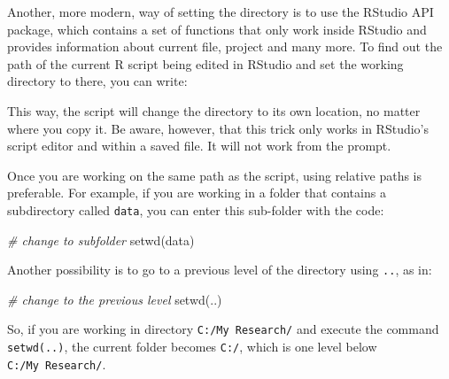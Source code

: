 \documentclass[
  12pt,
]{book}
\newenvironment{Shaded}{\begin{snugshade}}{\end{snugshade}}
\newcommand{\CommentTok}[1]{\textcolor[rgb]{0.37,0.37,0.37}{\textit{#1}}}
\newcommand{\FunctionTok}[1]{\textcolor[rgb]{0,0,0}{#1}}
\newcommand{\NormalTok}[1]{#1}
\newcommand{\OtherTok}[1]{\textcolor[rgb]{0.37,0.37,0.37}{#1}}
\newcommand{\SpecialCharTok}[1]{\textcolor[rgb]{0,0,0}{#1}}
\newcommand{\StringTok}[1]{\textcolor[rgb]{0.5,0.5,0.5}{#1}}
\begin{document}
Another, more modern, way of setting the directory is to use the RStudio API package, which contains a set of functions that only work inside RStudio and provides information about current file, project and many more. To find out the path of the current R script being edited in RStudio and set the working directory to there, you can write:

\begin{Shaded}
\end{Shaded}

This way, the script will change the directory to its own location, no matter where you copy it. Be aware, however, that this trick only works in RStudio's script editor and within a saved file. It will not work from the prompt.

Once you are working on the same path as the script, using relative paths is preferable. For example, if you are working in a folder that contains a subdirectory called \texttt{data}, you can enter this sub-folder with the code:

\begin{Shaded}
\begin{Highlighting}[]
\CommentTok{\# change to subfolder}
\FunctionTok{setwd}\NormalTok{(}\StringTok{\textquotesingle{}data\textquotesingle{}}\NormalTok{)}
\end{Highlighting}
\end{Shaded}

Another possibility is to go to a previous level of the directory using \texttt{..}, as in:

\begin{Shaded}
\begin{Highlighting}[]
\CommentTok{\# change to the previous level}
\FunctionTok{setwd}\NormalTok{(}\StringTok{\textquotesingle{}..\textquotesingle{}}\NormalTok{)}
\end{Highlighting}
\end{Shaded}

So, if you are working in directory \texttt{C:/My\ Research/} and execute the command \texttt{setwd(\textquotesingle{}..\textquotesingle{})}, the current folder becomes \texttt{C:/}, which is one level below \texttt{C:/My\ Research/}.
\end{document}
